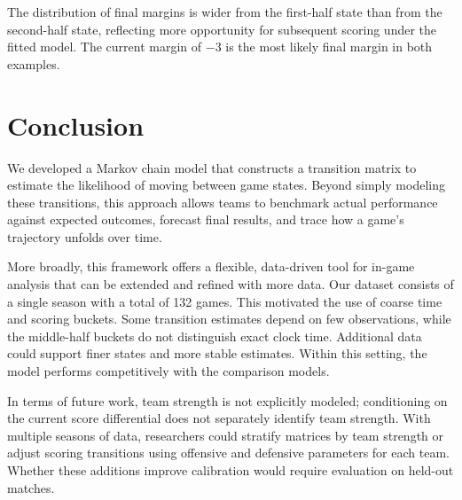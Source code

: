 \documentclass[12pt]{article}
\begin{document}
The distribution of final margins is wider from the first-half state than from the second-half state, reflecting more opportunity for subsequent scoring under the fitted model. The current margin of $-3$ is the most likely final margin in both examples.

\section{Conclusion}

We developed a Markov chain model that constructs a transition matrix to estimate the likelihood of moving between game states. Beyond simply modeling these transitions, this approach allows teams to benchmark actual performance against expected outcomes, forecast final results, and trace how a game's trajectory unfolds over time.

More broadly, this framework offers a flexible, data-driven tool for in-game analysis that can be extended and refined with more data.
Our dataset consists of a single season with a total of 132 games.
This motivated the use of coarse time and scoring buckets.
Some transition estimates depend on few observations, while the middle-half buckets do not distinguish exact clock time.
Additional data could support finer states and more stable estimates.
Within this setting, the model performs competitively with the comparison models.

In terms of future work, team strength is not explicitly modeled; conditioning on the current score differential does not separately identify team strength. With multiple seasons of data, researchers could stratify matrices by team strength or adjust scoring transitions using offensive and defensive parameters for each team. Whether these additions improve calibration would require evaluation on held-out matches.



\end{document}
